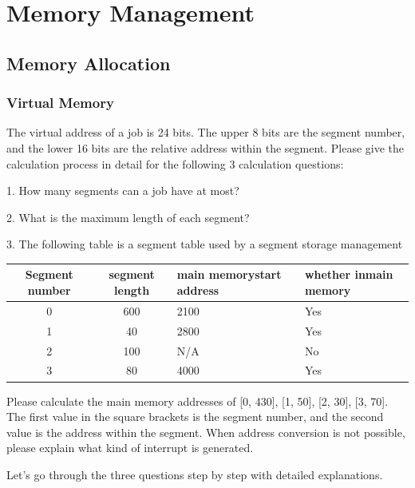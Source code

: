 \documentclass[a4paper]{book}
\begin{document}
\chapter{Memory Management}

\section{Memory Allocation}

\subsection{Virtual Memory}

\begin{greenbox}
The virtual address of a job is 24 bits. The upper 8 bits are the segment number, and the lower 16 bits are the relative address within the segment.
Please give the calculation process in detail for the following 3 calculation questions:

1. How many segments can a job have at most?

2. What is the maximum length of each segment?

3. The following table is a segment table used by a segment storage management

\vspace{0.5cm}
\begin{tabular}{|c|c|p{3cm}|p{3cm}|}
    \hline
    Segment number & segment length & main memory\newline start address & whether in\newline main memory \\ \hline
    0   & 600   & 2100  & Yes \\ \hline
    1   & 40    & 2800  & Yes \\ \hline
	2   & 100   & N/A   & No  \\ \hline
	3   & 80    & 4000  & Yes \\ \hline
\end{tabular}
\vspace{0.5cm}

Please calculate the main memory addresses of [0, 430], [1, 50], [2, 30], [3, 70]. The first value in the square brackets is the segment number, and the second value is the address within the segment. When address conversion is not possible, please explain what kind of interrupt is generated.
\end{greenbox}

Let's go through the three questions step by step with detailed explanations.
\end{document}
